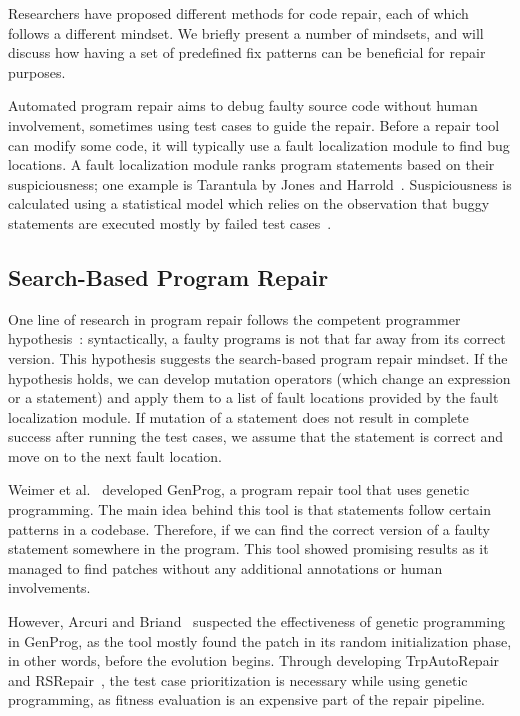 Researchers have proposed different methods for code repair, each of which follows a different mindset. We briefly present a number of mindsets, and will discuss how having a set of predefined fix patterns can be beneficial for repair purposes.

Automated program repair aims to debug faulty source code without human involvement, sometimes using test cases to guide the repair. Before a repair tool can modify some code, it will typically use a fault localization module to find bug locations. A fault localization module ranks program statements based on their suspiciousness; one example is Tarantula by Jones and Harrold~\cite{jones2005empirical}. Suspiciousness is calculated using a statistical model which relies on the observation that buggy statements are executed mostly by failed test cases~\cite{naish2009spectral,xie2013theoretical}. 

\subsection{Search-Based Program Repair}
One line of research in program repair follows the competent programmer hypothesis~\cite{gopinath2014mutant}: syntactically, a faulty programs is not that far away from its correct version. This hypothesis suggests the search-based program repair mindset. If the hypothesis holds, we can develop mutation operators (which change an expression or a statement) and apply them to a list of fault locations provided by the fault localization module. If mutation of a statement does not result in complete success after running the test cases, we assume that the statement is correct and move on to the next fault location.

Weimer et al.~\cite{forrest2009genetic,nguyen2009using} developed GenProg, a program repair tool that uses genetic programming. The main idea behind this tool is that statements follow certain patterns in a codebase. Therefore, if we can find the correct version of a faulty statement somewhere in the program. This tool showed promising results as it managed to find patches without any additional annotations or human involvements.

However, Arcuri and Briand~\cite{arcuri2011practical} suspected the effectiveness of genetic programming in GenProg, as the tool mostly found the patch in its random initialization phase, in other words, before the evolution begins. Through developing TrpAutoRepair~\cite{qi2013efficient} and RSRepair~\cite{qi2014strength}, the test case prioritization is necessary while using genetic programming, as fitness evaluation is an expensive part of the repair pipeline.

